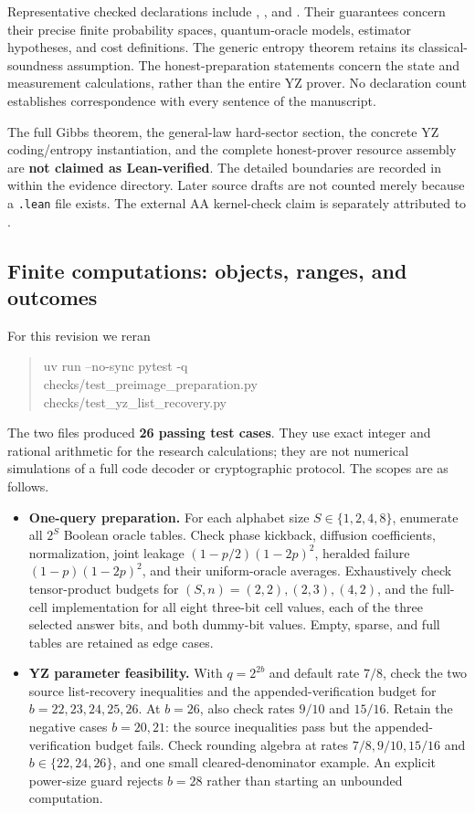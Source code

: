 \documentclass[11pt]{article}
\theoremstyle{definition}\newtheorem{definition}[theorem]{Definition}
\theoremstyle{remark}\newtheorem{remark}[theorem]{Remark}
\begin{document}
Representative checked declarations include
,
, and
.
Their guarantees concern their precise finite probability spaces, quantum-oracle models, estimator hypotheses, and cost definitions. The generic entropy theorem retains its classical-soundness assumption. The honest-preparation statements concern the state and measurement calculations, rather than the entire YZ prover. No declaration count establishes correspondence with every sentence of the manuscript.

The full Gibbs theorem, the general-law hard-sector section, the concrete YZ coding/entropy instantiation, and the complete honest-prover resource assembly are \textbf{not claimed as Lean-verified}. The detailed boundaries are recorded in  within the evidence directory. Later source drafts are not counted merely because a \texttt{.lean} file exists. The external AA kernel-check claim is separately attributed to \cite{Tur26}.

\subsection{Finite computations: objects, ranges, and outcomes}\label{sec:computation}
For this revision we reran
\begin{quote}\small\ttfamily
uv run --no-sync pytest -q\\
checks/test\_preimage\_preparation.py\\
checks/test\_yz\_list\_recovery.py
\end{quote}
The two files produced \textbf{26 passing test cases}. They use exact integer and rational arithmetic for the research calculations; they are not numerical simulations of a full code decoder or cryptographic protocol. The scopes are as follows.

\begin{itemize}
\item \textbf{One-query preparation.} For each alphabet size $S\in\{1,2,4,8\}$, enumerate all $2^S$ Boolean oracle tables. Check phase kickback, diffusion coefficients, normalization, joint leakage $(1-p/2)(1-2p)^2$, heralded failure $(1-p)(1-2p)^2$, and their uniform-oracle averages. Exhaustively check tensor-product budgets for $(S,n)=(2,2),(2,3),(4,2)$, and the full-cell implementation for all eight three-bit cell values, each of the three selected answer bits, and both dummy-bit values. Empty, sparse, and full tables are retained as edge cases.
\item \textbf{YZ parameter feasibility.} With $q=2^{2b}$ and default rate $7/8$, check the two source list-recovery inequalities and the appended-verification budget for $b=22,23,24,25,26$. At $b=26$, also check rates $9/10$ and $15/16$. Retain the negative cases $b=20,21$: the source inequalities pass but the appended-verification budget fails. Check rounding algebra at rates $7/8,9/10,15/16$ and $b\in\{22,24,26\}$, and one small cleared-denominator example. An explicit power-size guard rejects $b=28$ rather than starting an unbounded computation.
\end{itemize}
\end{document}
